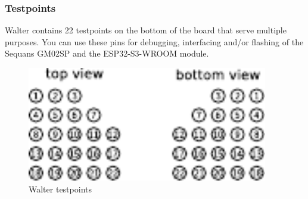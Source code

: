 \documentclass[11pt]{article}
\begin{document}
\newpage
\subsubsection{Testpoints} \label{testpoints}
Walter contains 22 testpoints on the bottom of the board that serve multiple purposes. You can use these pins for debugging, interfacing and/or flashing of the Sequans GM02SP and the ESP32-S3-WROOM module.
\begin{figure}[h]
    \centering
    \includegraphics[height=5cm]{walter-testpoints.pdf}
    \caption{Walter testpoints}
    \label{fig:testpoints}
\end{figure}
\end{document}
